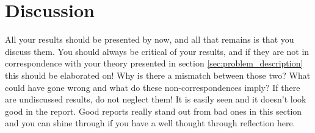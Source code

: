 \section{Discussion}
\label{sec:discussion}
All your results should be presented by now, and all that remains is that you discuss them. You should always be critical of your results, and if they are not in correspondence with your theory presented in section \ref{sec:problem_description} this should be elaborated on! Why is there a mismatch between those two? What could have gone wrong and what do these non-correspondences imply? If there are undiscussed results, do not neglect them! It is easily seen and it doesn't look good in the report. Good reports really stand out from bad ones in this section and you can shine through if you have a well thought through reflection here.